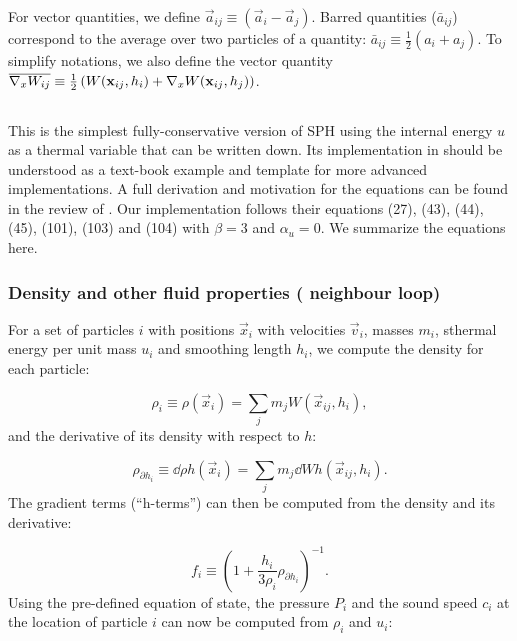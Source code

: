For vector quantities, we define $\vec{a}_{ij} \equiv (\vec{a}_i -
\vec{a}_j)$. Barred quantities ($\bar a_{ij}$) correspond to the
average over two particles of a quantity: $\bar a_{ij} \equiv
\frac{1}{2}(a_i + a_j)$. To simplify notations, we also define the
vector quantity $\overline{\nabla_xW_{ij}} \equiv \frac{1}{2}\left(W({\mathbf{x}}_{ij}, h_i) +
\nabla_x W({\mathbf{x}}_{ij},h_j)\right)$.


\subsection{\MinimalSPH}
\label{sec:sph:minimal}

This is the simplest fully-conservative version of SPH using the
internal energy $u$ as a thermal variable that can be written
down. Its implementation in \swift should be understood as a text-book
example and template for more advanced implementations. A full
derivation and motivation for the equations can be found in the review
of \cite{Price2012}. Our implementation follows their equations (27),
(43), (44), (45), (101), (103) and (104) with $\beta=3$ and
$\alpha_u=0$. We summarize the equations here.

\subsubsection{Density and other fluid properties ( neighbour loop)}

For a set of particles $i$ with positions $\vec{x}_i$ with velocities
$\vec{v}_i$, masses $m_i$, sthermal energy per unit mass $u_i$ and
smoothing length $h_i$, we compute the density for each particle:

\begin{equation}
  \rho_i \equiv \rho(\vec{x}_i) = \sum_j m_j W(\vec{x}_{ij}, h_i),
  \label{eq:sph:minimal:rho}
\end{equation}
and the derivative of its density with respect to $h$:

\begin{equation}
    \label{eq:sph:minimal:rho_dh}
  \rho_{\partial h_i} \equiv \dd{\rho}{h}(\vec{x}_i) = \sum_j m_j \dd{W}{h}(\vec{x}_{ij}
  , h_i).
\end{equation}
The gradient terms (``h-terms'') can then be computed from the density
and its derivative:

\begin{equation}
  f_i \equiv \left(1 + \frac{h_i}{3\rho_i}\rho_{\partial h_i}
  \right)^{-1}.
  \label{eq:sph:minimal:f_i}
\end{equation}
Using the pre-defined equation of state, the pressure $P_i$ and the sound
speed $c_i$ at the location of particle $i$ can now be computed from
$\rho_i$ and $u_i$:

